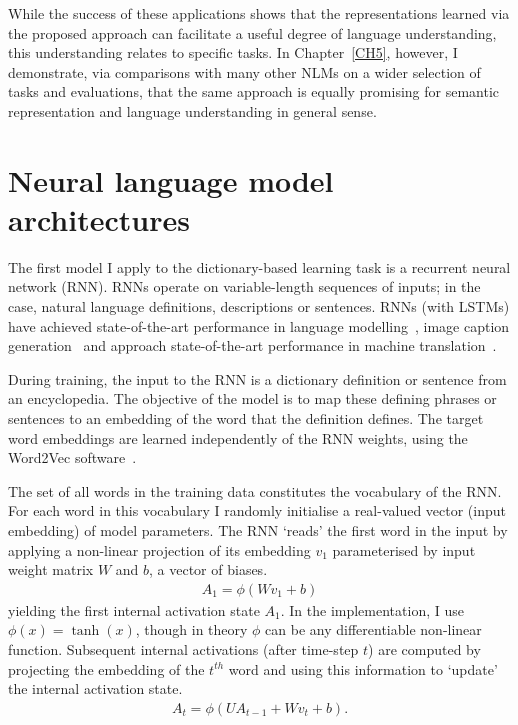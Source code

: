 While the success of these applications shows that the representations learned via the proposed approach can facilitate a useful degree of language understanding, this understanding relates to specific tasks. In Chapter~\ref{CH5}, however, I demonstrate, via comparisons with many other NLMs on a wider selection of tasks and evaluations, that the same approach is equally promising for semantic representation and language understanding in general sense. 

\section{Neural language model architectures}

The first model I apply to the dictionary-based learning task is a recurrent neural network (RNN). RNNs operate on variable-length sequences of inputs; in the case, natural language definitions, descriptions or sentences. RNNs (with LSTMs) have achieved state-of-the-art performance in language modelling~\citep{mikolov2010recurrent}, image caption generation~\citep{kiros2014unifying} and approach state-of-the-art performance in machine translation~\citep{bahdanau2014neural}. 

During training, the input to the RNN is a dictionary definition or sentence from an encyclopedia. The objective of the model is to map these defining phrases or sentences to an embedding of the word that the definition defines. The target word embeddings are learned independently of the RNN weights, using the Word2Vec software~\citep{mikolov2013distributed}.   

The set of all words in the training data constitutes the vocabulary of the RNN. For each word in this vocabulary I randomly initialise a real-valued vector (input embedding) of model parameters. The RNN `reads' the first word in the input by applying a non-linear projection of its embedding \(v_1\) parameterised by input weight matrix \(W\) and \(b\), a vector of biases.
\begin{align*}
A_1 = \phi( Wv_1 + b) 
\end{align*}
yielding the first internal activation state \(A_1\). In the implementation, I
use \(\phi(x) = \tanh(x)\), though in theory \(\phi\) can be any differentiable
non-linear function. Subsequent internal activations (after time-step \(t\))
are computed by projecting the embedding of the \(t^{th}\) word and using this
information to `update' the internal activation state. 
\begin{align*}
A_t =  \phi( UA_{t-1} + Wv_t + b ). 
\end{align*}

